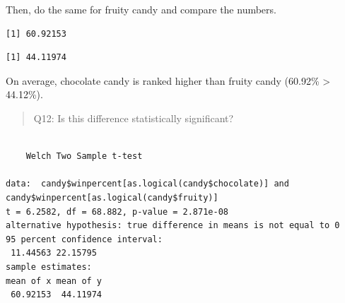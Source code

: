 \documentclass[
  letterpaper,
  DIV=11,
  numbers=noendperiod]{scrartcl}
\newenvironment{Shaded}{\begin{snugshade}}{\end{snugshade}}
\newcommand{\FunctionTok}[1]{\textcolor[rgb]{0.28,0.35,0.67}{#1}}
\newcommand{\NormalTok}[1]{\textcolor[rgb]{0.00,0.23,0.31}{#1}}
\newcommand{\SpecialCharTok}[1]{\textcolor[rgb]{0.37,0.37,0.37}{#1}}
\begin{document}
Then, do the same for fruity candy and compare the numbers.

\begin{Shaded}
\end{Shaded}

\begin{verbatim}
[1] 60.92153
\end{verbatim}

\begin{Shaded}
\end{Shaded}

\begin{verbatim}
[1] 44.11974
\end{verbatim}

On average, chocolate candy is ranked higher than fruity candy (60.92\%
\textgreater{} 44.12\%).

\begin{quote}
Q12: Is this difference statistically significant?
\end{quote}

\begin{Shaded}
\end{Shaded}

\begin{verbatim}

    Welch Two Sample t-test

data:  candy$winpercent[as.logical(candy$chocolate)] and candy$winpercent[as.logical(candy$fruity)]
t = 6.2582, df = 68.882, p-value = 2.871e-08
alternative hypothesis: true difference in means is not equal to 0
95 percent confidence interval:
 11.44563 22.15795
sample estimates:
mean of x mean of y 
 60.92153  44.11974 
\end{verbatim}
\end{document}
